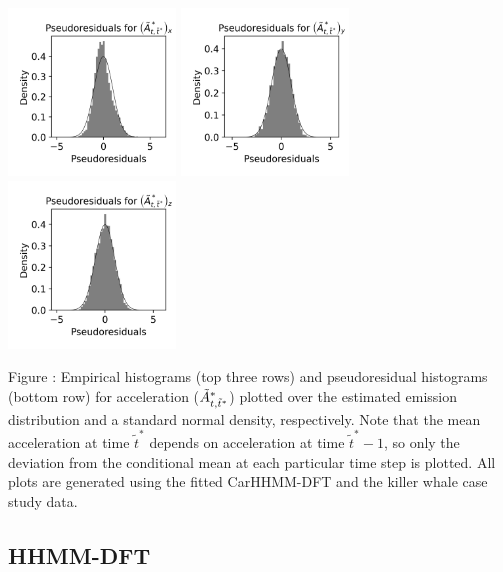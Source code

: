 \documentclass{article}
\begin{document}
\begin{center}
        \includegraphics[width=1.75in]{../Plots/2019/20190902-182840-CATs_OB_1_0_267_CarHHMM2_pseudresids_Ax.png}
        \includegraphics[width=1.75in]{../Plots/2019/20190902-182840-CATs_OB_1_0_267_CarHHMM2_pseudresids_Ay.png}
        \includegraphics[width=1.75in]{../Plots/2019/20190902-182840-CATs_OB_1_0_267_CarHHMM2_pseudresids_Az.png}
        \end{center}
        
        \noindent Figure : Empirical histograms (top three rows) and pseudoresidual histograms (bottom row) for acceleration ($\tilde{A}^*_{t,\tilde t^*}$) plotted over the estimated emission distribution and a standard normal density, respectively. Note that the mean acceleration at time $\tilde t^*$ depends on acceleration at time $\tilde t^*-1$, so only the deviation from the conditional mean at each particular time step is plotted. All plots are generated using the fitted CarHHMM-DFT and the killer whale case study data.
        \addtocounter{fignum}{1}
        
        \newpage
        
        \subsection{HHMM-DFT}
        
\end{document}
